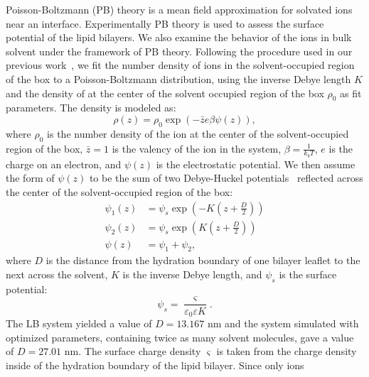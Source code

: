 Poisson-Boltzmann (PB) theory is a mean field approximation for
solvated ions near an interface. Experimentally PB theory is used to
assess the surface potential of the lipid bilayers. We also examine
the behavior of the ions in bulk solvent under the framework of PB
theory. Following the procedure used in our previous
work~\cite{saunders:2019}, we fit the number density of \cl{} ions in
the solvent-occupied region of the box to a Poisson-Boltzmann
distribution, using the inverse Debye length $K$ and the density of
\cl{} at the center of the solvent occupied region of the box $\rho_0$
as fit parameters. 
The density is modeled as:
\begin{equation}
    \label{eq:gcdens}
    \rho (z)= \rho _{0} \exp{(- \bar{z} e \beta \psi (z))},
\end{equation}
where $\rho_0$ is the number density of the ion at the center of the
solvent-occupied region of the box, $\bar{z}=1$ is the valency of the
ion in the system, $\beta=\frac{1}{k_b T}$, $e$ is the charge on an
electron, and $\psi(z)$ is the electrostatic potential. We then assume
the form of $\psi(z)$ to be the sum of two Debye-Huckel
potentials~\cite{israelachvili:2011:intermol} reflected across the
center of the solvent-occupied region of the box:
\begin{equation}
    \begin{split}
    \psi_1(z)&=\psi_s \exp(-K(z+\frac{D}{2})) \\
    \psi_2(z)&=\psi_s \exp(K(z+\frac{D}{2})) \\
    \psi(z)&=\psi_1 + \psi_2\text{,}
    \label{eq:gcpot}
\end{split}
\end{equation}
where $D$ is the distance from the hydration boundary of one bilayer leaflet
to the next across the solvent, $K$ is the inverse Debye length, and $\psi_s$ is the surface potential:
\begin{equation}
    \psi_s = \frac{\varsigma}{\varepsilon_0\varepsilon K}\text{.}
\label{eq:gcspot}
\end{equation}
The LB system yielded a value of $D=13.167$ nm and the system
simulated with optimized parameters, containing twice as many 
solvent molecules,
gave a value of $D=27.01$ nm.
The surface charge density $\varsigma$ is taken from the charge density inside
of the hydration boundary of the lipid bilayer. Since only ions

